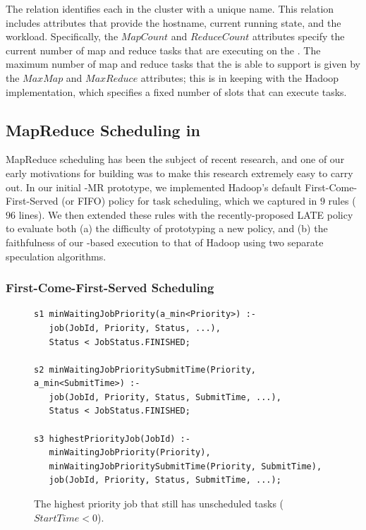 The  relation identifies each {\TT} in the cluster with a
unique name.  This relation includes attributes that provide the hostname,
current running state, and the \TT workload.  Specifically, the $MapCount$ and
$ReduceCount$ attributes specify the current number of map and reduce tasks
that are executing on the \TT.  The maximum number of map and reduce tasks that
the \TT is able to support is given by the $MaxMap$ and $MaxReduce$ attributes;
this is in keeping with the Hadoop implementation, which specifies a fixed
number of slots that can execute tasks.


\subsection{MapReduce Scheduling in \OVERLOG}
\label{ch:boom:sec:scheduler}

MapReduce scheduling has been the subject of recent research, and one of our
early motivations for building \BOOMA was to make this research extremely easy
to carry out.  In our initial \BOOM-MR prototype, we implemented Hadoop's
default First-Come-First-Served (or FIFO) policy for task scheduling, which we
captured in $9$ rules ($96$ lines).  We then extended these rules with the
recently-proposed LATE policy~\cite{zaharia-late} to evaluate both (a) the
difficulty of prototyping a new policy, and (b) the faithfulness of our
\OVERLOG-based execution to that of Hadoop using two separate speculation
algorithms.

\subsubsection{First-Come-First-Served Scheduling}

\begin{figure}
\label{fig:joborder}
\ssp
\centering
\begin{lstlisting}
s1 minWaitingJobPriority(a_min<Priority>) :-
   job(JobId, Priority, Status, ...),
   Status < JobStatus.FINISHED;
	
s2 minWaitingJobPrioritySubmitTime(Priority, a_min<SubmitTime>) :-
   job(JobId, Priority, Status, SubmitTime, ...),
   Status < JobStatus.FINISHED;

s3 highestPriorityJob(JobId) :-
   minWaitingJobPriority(Priority),
   minWaitingJobPrioritySubmitTime(Priority, SubmitTime),
   job(JobId, Priority, Status, SubmitTime, ...);
\end{lstlisting}
\caption{\label{ch:boom:fig:joborder}The highest priority job that still has unscheduled tasks ($StartTime < 0$).}
\end{figure}

